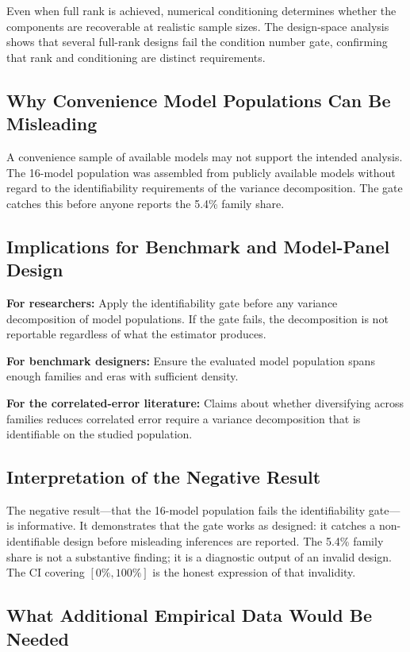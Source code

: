 \documentclass[journal]{IEEEtran}
\begin{document}
Even when full rank is achieved, numerical conditioning determines whether the components are recoverable at realistic sample sizes. The design-space analysis shows that several full-rank designs fail the condition number gate, confirming that rank and conditioning are distinct requirements.

\subsection{Why Convenience Model Populations Can Be Misleading}

A convenience sample of available models may not support the intended analysis. The 16-model population was assembled from publicly available models without regard to the identifiability requirements of the variance decomposition. The gate catches this before anyone reports the 5.4\% family share.

\subsection{Implications for Benchmark and Model-Panel Design}

\textbf{For researchers:} Apply the identifiability gate before any variance decomposition of model populations. If the gate fails, the decomposition is not reportable regardless of what the estimator produces.

\textbf{For benchmark designers:} Ensure the evaluated model population spans enough families and eras with sufficient density.

\textbf{For the correlated-error literature:} Claims about whether diversifying across families reduces correlated error require a variance decomposition that is identifiable on the studied population.

\subsection{Interpretation of the Negative Result}

The negative result---that the 16-model population fails the identifiability gate---is informative. It demonstrates that the gate works as designed: it catches a non-identifiable design before misleading inferences are reported. The 5.4\% family share is not a substantive finding; it is a diagnostic output of an invalid design. The CI covering $[0\%, 100\%]$ is the honest expression of that invalidity.

\subsection{What Additional Empirical Data Would Be Needed}
\end{document}

